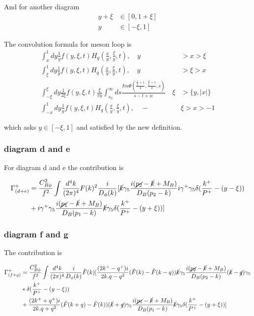 \documentclass[preprintnumbers,prd,superscriptaddress,preprint]{revtex4-1}
\begin{document}
	And for another diagram 
	\begin{align*}
		y+\xi & \in[0,1+\xi]\\
		y & \in[-\xi,1]
	\end{align*}
	
	The convolution formula for meson loop is
	\begin{align*}
		\int_{x}^{1}dy\frac{1}{y}f(y,\xi,t)H_{q}(\frac{x}{y},\frac{\xi}{y},t),\quad y & >x>\xi\\
		\int_{\xi}^{1}dy\frac{1}{y}f(y,\xi,t)H_{q}(\frac{x}{y},\frac{\xi}{y},t),\quad y & >\xi>x\\
		\int_{-\xi}^{\xi}dy\frac{1}{2\xi}f(y,\xi,t)\frac{\xi}{\pi y}\int_{s_{0}}^{\infty}ds\frac{Im\Phi(\frac{\frac{x}{\xi}+1}{2},\frac{\frac{y}{\xi}+1}{2},s)}{s-t+i\epsilon}\quad\xi & >\{y,|x|\}\\
		\int_{-x}^{1}dy\frac{1}{y}f(y,\xi,t)H_{q}(\frac{x}{y},\frac{\xi}{y},t),\quad- & \xi>x>-1
	\end{align*}
	
	which asks $y\in[-\xi,1]$ and satisfied by the new definition.
	
	\subsubsection{diagram d and e }
	
	For diagram d and e the contribution is 
	
	\begin{align*}
		\Gamma_{(d+e)}^{+} & =\frac{C_{B\phi}^{2}}{f^{2}}\int\frac{d^{4}k}{(2\pi)^{4}}F(k)^{2}\frac{i}{D_{\phi}(k)}[\cancel{k}\gamma_{5}\frac{i(\cancel{p_{2}}-\cancel{k}+M_{B})}{D_{B}(p_{2}-k)}i\gamma^{+}\gamma_{5}\delta(\frac{k^{+}}{P^{+}}-(y-\xi))\\
		& +i\gamma^{+}\gamma_{5}\frac{i(\cancel{p_{1}}-\cancel{k}+M_{B})}{D_{B}(p_{1}-k)}\cancel{k}\gamma_{5}\delta(\frac{k^{+}}{P^{+}}-(y+\xi))]
	\end{align*}
	
	
	\subsubsection{diagram f and g}
	
	The contribution is 
	
	\begin{align*}
		\Gamma_{(f+g)}^{+} & =\frac{C_{B\phi}^{2}}{f^{2}}\int\frac{d^{4}k}{(2\pi)^{4}}\frac{i}{D_{\phi}(k)}\tilde{F}(k)[\frac{(2k^{+}-q^{+})i}{2k.q-q^{2}}(\tilde{F}(k)-\tilde{F}(k-q))\cancel{k}\gamma_{5}\frac{i(\cancel{p_{2}}-\cancel{k}+M_{B})}{D_{B}(p_{2}-k)}(\cancel{k}-\cancel{q})\gamma_{5}\\
		& *\delta(\frac{k^{+}}{P^{+}}-(y-\xi))\\
		& +\frac{(2k^{+}+q^{+})i}{2k.q+q^{2}}(\tilde{F}(k+q)-\tilde{F}(k))(\cancel{k}+\cancel{q})\gamma_{5}\frac{i(\cancel{p_{1}}-\cancel{k}+M_{B})}{D_{B}(p_{1}-k)}\cancel{k}\gamma_{5}\delta(\frac{k^{+}}{P^{+}}-(y+\xi))]
	\end{align*}
	
\end{document}
